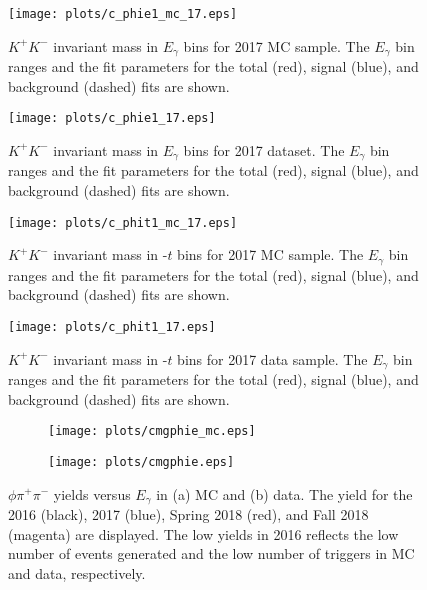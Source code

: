 \begin{figure}[H]
    \centering
    \texttt{[image: plots/c\_phie1\_mc\_17.eps]}
    \caption{\label{fig.y2175.xsec_ul.phi2pi.3}$K^{+}K^{-}$ invariant mass in $E_{\gamma}$ bins for 2017 MC sample. The $E_{\gamma}$ bin ranges and the fit parameters for the total (red), signal (blue), and background (dashed) fits are shown.}
\end{figure}

\begin{figure}[H]
    \centering
    \texttt{[image: plots/c\_phie1\_17.eps]}
    \caption{\label{fig.y2175.xsec_ul.phi2pi.4}$K^{+}K^{-}$ invariant mass in $E_{\gamma}$ bins for 2017 dataset. The $E_{\gamma}$ bin ranges and the fit parameters for the total (red), signal (blue), and background (dashed) fits are shown.}
\end{figure}

\begin{figure}[H]
    \centering
    \texttt{[image: plots/c\_phit1\_mc\_17.eps]}
    \caption{\label{fig.y2175.xsec_ul.phi2pi.5}$K^{+}K^{-}$ invariant mass in -$t$ bins for 2017 MC sample. The $E_{\gamma}$ bin ranges and the fit parameters for the total (red), signal (blue), and background (dashed) fits are shown.}
\end{figure}

\begin{figure}[H]
    \centering
    \texttt{[image: plots/c\_phit1\_17.eps]}
    \caption{\label{fig.y2175.xsec_ul.phi2pi.6}$K^{+}K^{-}$ invariant mass in -$t$ bins for 2017 data sample. The $E_{\gamma}$ bin ranges and the fit parameters for the total (red), signal (blue), and background (dashed) fits are shown.}
\end{figure}

\begin{figure}[H]
    \centering
    \begin{subfigure}[b]{0.5\textwidth}
        \texttt{[image: plots/cmgphie\_mc.eps]}
        \caption{}
        \label{fig.y2175.xsec_ul.phi2pi.7.a}
    \end{subfigure}\hfill
    \begin{subfigure}[b]{0.5\textwidth}
        \texttt{[image: plots/cmgphie.eps]}
        \caption{}
        \label{fig.y2175.xsec_ul.phi2pi.7.b}
    \end{subfigure}
    \caption{\label{fig.y2175.xsec_ul.phi2pi.7}$\phi \pi^+ \pi^-$ yields versus $E_{\gamma}$ in (a) MC and (b) data. The yield for the 2016 (black), 2017 (blue), Spring 2018 (red), and Fall 2018 (magenta) are displayed. The low yields in 2016 reflects the low number of events generated and the low number of triggers in MC and data, respectively.}
\end{figure}


